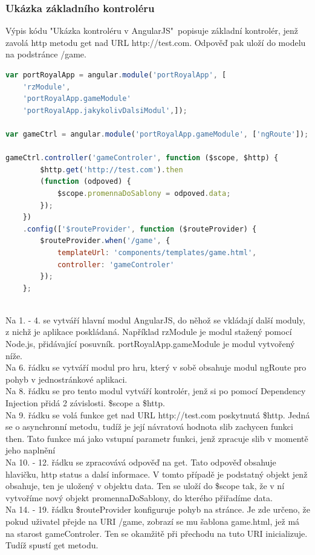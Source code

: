 \documentclass[czech,master,public,dept460,male,cpdeclaration,twoside]{diploma}
\begin{document}
\subsubsection{Ukázka základního kontroléru}
Výpis kódu "Ukázka kontroléru v AngularJS"~popisuje základní kontrolér, jenž zavolá http metodu get nad URL http://test.com. Odpověď pak uloží do modelu na podstránce /game.
\\
\begin{lstlisting}[language=JavaScript, caption=Ukázka kontroléru v AngularJS]
var portRoyalApp = angular.module('portRoyalApp', [
    'rzModule',
    'portRoyalApp.gameModule'
    'portRoyalApp.jakykolivDalsiModul',]);

var gameCtrl = angular.module('portRoyalApp.gameModule', ['ngRoute']);

gameCtrl.controller('gameControler', function ($scope, $http) {
        $http.get('http://test.com').then
        (function (odpoved) {
            $scope.promennaDoSablony = odpoved.data;
        });
    })
    .config(['$routeProvider', function ($routeProvider) {
        $routeProvider.when('/game', {
            templateUrl: 'components/templates/game.html',
            controller: 'gameControler'
        });
    };
\end{lstlisting}
~\\
Na 1. - 4. se vytváří hlavní modul AngularJS, do něhož se vkládají další moduly, z nichž je aplikace poskládaná. Například rzModule je modul stažený pomocí Node.js, přidávající posuvník. portRoyalApp.gameModule je modul vytvořený níže.\\
Na 6. řádku se vytváří modul pro hru, který v sobě obsahuje modul ngRoute pro pohyb v jednostránkové aplikaci.\\
Na 8. řádku se pro tento modul vytváří kontrolér, jenž si po pomocí Dependency Injection přidá 2 závislosti. \$scope a \$http.\\
Na 9. řádku se volá funkce get nad URL http://test.com poskytnutá \$http. Jedná se o asynchronní metodu, tudíž je její návratová hodnota slib zachycen funkci then. Tato funkce má jako vstupní parametr funkci, jenž zpracuje slib v momentě jeho naplnění\\
Na 10. - 12. řádku se zpracovává odpověď na get. Tato odpověď obsahuje hlavičku, http status a dalsí informace. V tomto případě je podstatný objekt jenž obsahuje, ten je uložený v objektu data. Ten se uloží do \$scope tak, že v ní vytvoříme nový objekt promennaDoSablony, do kterého přiřadíme data.\\
Na 14. - 19.  řádku \$routeProvider konfiguruje pohyb na stránce. Je zde určeno, že pokud uživatel přejde na URI /game, zobrazí se mu šablona game.html, jež má na starost gameControler. Ten se okamžitě při přechodu na tuto URI inicializuje. Tudíž spustí get metodu.
\end{document}
